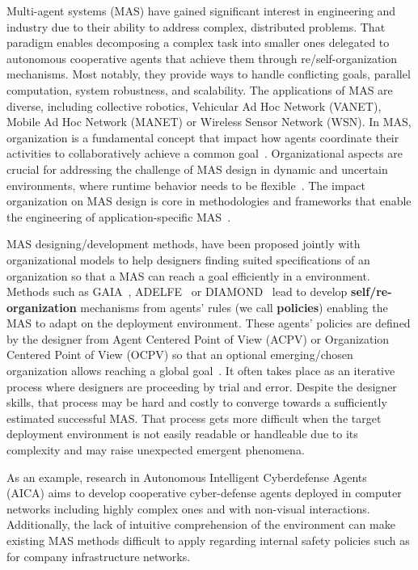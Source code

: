 \documentclass[runningheads]{llncs}
\begin{document}
Multi-agent systems (MAS) have gained significant interest in engineering and industry due to their ability to address complex, distributed problems. That paradigm enables decomposing a complex task into smaller ones delegated to autonomous cooperative agents that achieve them through re/self-organization mechanisms. Most notably, they provide ways to handle conflicting goals, parallel computation, system robustness, and scalability. The applications of MAS are diverse, including collective robotics, Vehicular Ad Hoc Network (VANET), Mobile Ad Hoc Network (MANET) or Wireless Sensor Network (WSN)\cite{Oliveira1999, Gembarski2020}.
In MAS, organization is a fundamental concept that impact how agents coordinate their activities to collaboratively achieve a common goal~\cite{Hubner2002}.
Organizational aspects are crucial for addressing the challenge of MAS design in dynamic and uncertain environments, where runtime behavior needs to be flexible~\cite{Kathleen2020}. The impact organization on MAS design is core in methodologies and frameworks that enable the engineering of application-specific MAS~\cite{Bakliwal2018}.

MAS designing/development methods, have been proposed jointly with organizational models to help designers finding suited specifications of an organization so that a MAS can reach a goal efficiently in a environment. Methods such as GAIA~\cite{Wooldridge2000}, ADELFE~\cite{Bernon2003} or DIAMOND~\cite{Jamont2005} lead to develop \textbf{self/re-organization} mechanisms from agents' rules (we call \textbf{policies}) enabling the MAS to adapt on the deployment environment.
These agents' policies are defined by the designer from Agent Centered Point of View (ACPV) or Organization Centered Point of View (OCPV) so that an optional emerging/chosen organization allows reaching a global goal~\cite{Picard2009}. It often takes place as an iterative process where designers are proceeding by trial and error. Despite the designer skills, that process may be hard and costly to converge towards a sufficiently estimated successful MAS. That process gets more difficult when the target deployment environment is not easily readable or handleable due to its complexity and may raise unexpected emergent phenomena.

As an example, research in Autonomous Intelligent Cyberdefense Agents~\cite{Kott2023} (AICA) aims to develop cooperative cyber-defense agents deployed in computer networks including highly complex ones and with non-visual interactions. Additionally, the lack of intuitive comprehension of the environment can make existing MAS methods difficult to apply regarding internal safety policies such as for company infrastructure networks.
\end{document}

